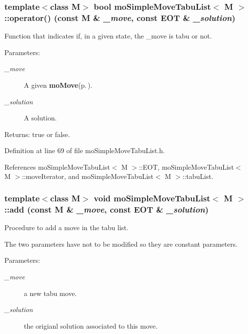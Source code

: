 \subsubsection{\setlength{\rightskip}{0pt plus 5cm}template$<$class M$>$ bool {\bf mo\-Simple\-Move\-Tabu\-List}$<$ M $>$::operator() (const M \& {\em \_\-move}, const {\bf EOT} \& {\em \_\-solution})\hspace{0.3cm}{\tt  [inline]}}\label{classmo_simple_move_tabu_list_a1}


Function that indicates if, in a given state, the \_\-move is tabu or not. 

\begin{Desc}
\item[Parameters:]
\begin{description}
\item[{\em \_\-move}]A given {\bf mo\-Move}{\rm (p.\,\pageref{classmo_move})}. \item[{\em \_\-solution}]A solution. \end{description}
\end{Desc}
\begin{Desc}
\item[Returns:]true or false. \end{Desc}


Definition at line 69 of file mo\-Simple\-Move\-Tabu\-List.h.

References mo\-Simple\-Move\-Tabu\-List$<$ M $>$::EOT, mo\-Simple\-Move\-Tabu\-List$<$ M $>$::move\-Iterator, and mo\-Simple\-Move\-Tabu\-List$<$ M $>$::tabu\-List.
\subsubsection{\setlength{\rightskip}{0pt plus 5cm}template$<$class M$>$ void {\bf mo\-Simple\-Move\-Tabu\-List}$<$ M $>$::add (const M \& {\em \_\-move}, const {\bf EOT} \& {\em \_\-solution})\hspace{0.3cm}{\tt  [inline, virtual]}}\label{classmo_simple_move_tabu_list_a2}


Procedure to add a move in the tabu list. 

The two parameters have not to be modified so they are constant parameters.

\begin{Desc}
\item[Parameters:]
\begin{description}
\item[{\em \_\-move}]a new tabu move. \item[{\em \_\-solution}]the origianl solution associated to this move. \end{description}
\end{Desc}


